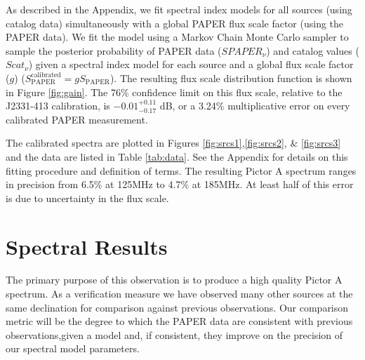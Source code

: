 \documentclass[preprint]{aastex}
\newcommand{\PAPER}{\mathrm{PAPER}}
\begin{document}
As described in the Appendix, we fit spectral index models for all sources (using catalog data) simultaneously with a global PAPER flux scale factor (using the PAPER data). We fit the model using a Markov Chain Monte Carlo sampler to sample the posterior probability of PAPER data ($SPAPER_{\nu}$) and catalog values ($Scat_{\nu}$) given a spectral index model for each source and a global flux scale factor ($g$) ($S_\PAPER^\textrm{calibrated} = g S_\PAPER$). The resulting flux scale distribution function is shown in Figure \ref{fig:gain}. The 76\% confidence limit on this flux scale, relative to the J2331-413 calibration, is  $-0.01 ^{+0.11}_{-0.17}$ dB, or a 3.24\% multiplicative error on every calibrated PAPER measurement.  


The calibrated spectra are plotted in Figures \ref{fig:srcs1},\ref{fig:srcs2}, \& \ref{fig:srcs3} and the data are listed in Table \ref{tab:data}.  See the Appendix for details on this fitting procedure and definition of terms.  The resulting Pictor A spectrum ranges in precision from 6.5\% at 125MHz to 4.7\% at 185MHz. At least half of this error is due to uncertainty in the flux scale.  %








 \section{Spectral Results}
 \label{sec:fits}
The primary purpose of this observation is to produce a high quality Pictor A spectrum. As a verification measure we have observed many other sources at the same declination for comparison against previous observations.  Our comparison metric will be the degree to which the PAPER data are consistent with previous observations,given a model and, if consistent, they improve on the precision of our spectral model parameters.
\end{document}
